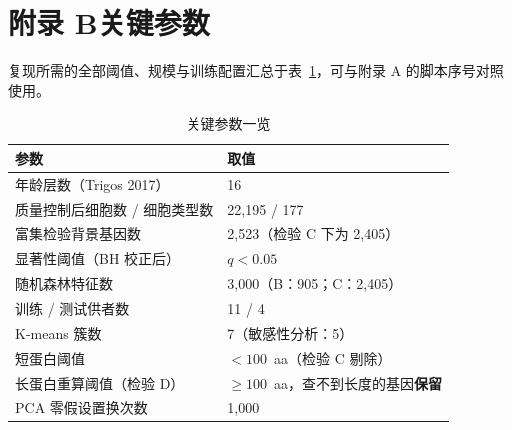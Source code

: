 \documentclass{cjc}
\begin{document}
\onecolumn
\section*{附录 B\quad 关键参数}

复现所需的全部阈值、规模与训练配置汇总于表~\ref{tab:params}，可与附录 A 的脚本序号对照使用。

\begin{table}[H]
  \centering
  \caption{关键参数一览}
  \label{tab:params}
  \small
  \begin{tabularx}{\textwidth}{@{}>{\raggedright\arraybackslash}p{5.0cm}X@{}}
    \toprule
    参数 & 取值 \\
    \midrule
    年龄层数（Trigos 2017） & 16 \\
    质量控制后细胞数 / 细胞类型数 & 22,195 / 177 \\
    富集检验背景基因数 & 2,523（检验 C 下为 2,405） \\
    显著性阈值（BH 校正后） & $q < 0.05$ \\
    随机森林特征数 & 3,000（B：905；C：2,405） \\
    训练 / 测试供者数 & 11 / 4 \\
    K-means 簇数 & 7（敏感性分析：5） \\
    短蛋白阈值 & $< 100$~aa（检验 C 剔除） \\
    长蛋白重算阈值（检验 D） & $\ge 100$~aa，查不到长度的基因\textbf{保留} \\
    PCA 零假设置换次数 & 1,000 \\
    \bottomrule
  \end{tabularx}
\end{table}
\end{document}
